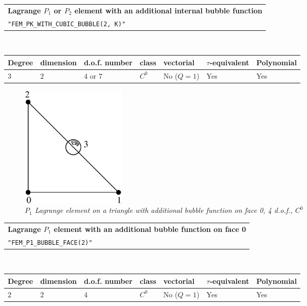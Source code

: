 \documentclass[10pt,a4paper]{article}
\begin{document}
\begin{center}
\begin{tabular}{|m{16.11cm}|} \hline 
{ \bf Lagrange $P_1$ or $P_2$ element with an additional internal bubble function}\\
{\tt "FEM\_PK\_WITH\_CUBIC\_BUBBLE(2, K)"} 
\end{tabular} \\ \vspace{-1pt} 
\begin{tabular}{|m{2cm}|m{2cm}|m{2.5cm}|m{1.2cm}|m{2cm}|m{2cm}|m{1.8cm}|} \hline 
Degree & dimension & d.o.f. number & class & vectorial & \mbox{$\tau$-equivalent} & Polynomial\\ \hline
$3$ & $2$ & $4$ or $7$ & $C^0$ & No \mbox{($Q = 1$)} & Yes & Yes\\ \hline
\end{tabular}
\end{center}

\begin{figure}[H]
  \begin{center}
    \includegraphics[width=5cm,angle=0]{getfemlist_triangle_P1_bubble_face.eps}
  \end{center}
  \caption{ \it $P_1$ Lagrange element on a triangle with additional bubble function on face 0, 4 d.o.f., $C^0$} 
  \label{fig:triangle_p1_bubble_face}
\end{figure}

\begin{center}
\begin{tabular}{|m{16.11cm}|} \hline 
{ \bf Lagrange $P_1$ element with an additional bubble function on face 0}\\
{\tt "FEM\_P1\_BUBBLE\_FACE(2)"} 
\end{tabular} \\ \vspace{-1pt} 
\begin{tabular}{|m{2cm}|m{2cm}|m{2.5cm}|m{1.2cm}|m{2cm}|m{2cm}|m{1.8cm}|} \hline 
Degree & dimension & d.o.f. number & class & vectorial & \mbox{$\tau$-equivalent} & Polynomial\\ \hline
$2$ & $2$ & $4$ & $C^0$ & No \mbox{($Q = 1$)} & Yes & Yes\\ \hline
\end{tabular}
\end{center}
\end{document}
